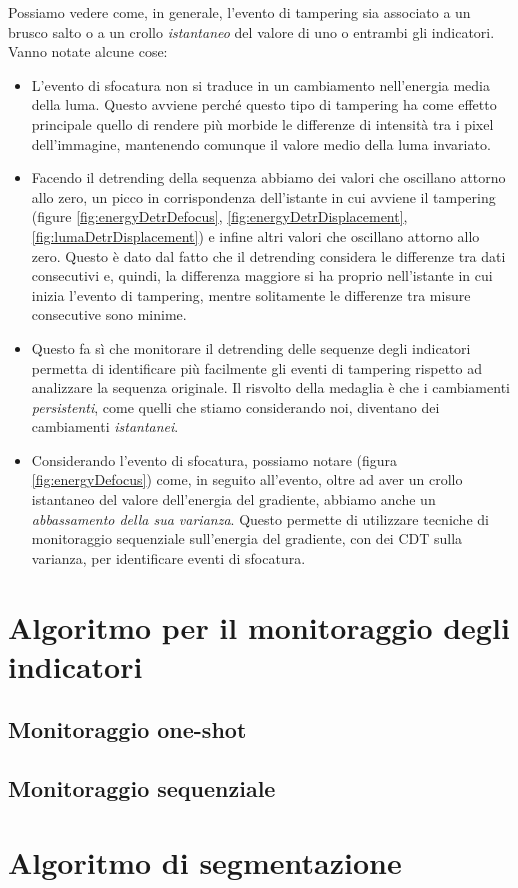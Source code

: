 \noindent Possiamo vedere come, in generale, l'evento di tampering sia associato a un brusco salto o a un crollo \textit{istantaneo} del valore di uno o entrambi gli indicatori.
Vanno notate alcune cose:
\begin{itemize}
	\item L'evento di sfocatura non si traduce in un cambiamento nell'energia media della luma.
	Questo avviene perch\'e questo tipo di tampering ha come effetto principale quello di rendere pi\`u morbide le differenze di intensit\`a tra i pixel dell'immagine, mantenendo comunque il valore medio della luma invariato.
	\item Facendo il detrending della sequenza abbiamo dei valori che oscillano attorno allo zero, un picco in corrispondenza dell'istante in cui avviene il tampering (figure \ref{fig:energyDetrDefocus}, \ref{fig:energyDetrDisplacement}, \ref{fig:lumaDetrDisplacement}) e infine altri valori che oscillano attorno allo zero.
	Questo \`e dato dal fatto che il detrending considera le differenze tra dati consecutivi e, quindi, la differenza maggiore si ha proprio nell'istante in cui inizia l'evento di tampering, mentre solitamente le differenze tra misure consecutive sono minime. 
	\item Questo fa s\`i che monitorare il detrending delle sequenze degli indicatori permetta di identificare pi\`u facilmente gli eventi di tampering rispetto ad analizzare la sequenza originale.
	Il risvolto della medaglia \`e che i cambiamenti \textit{persistenti}, come quelli che stiamo considerando noi, diventano dei cambiamenti \textit{istantanei}.
	\item Considerando l'evento di sfocatura, possiamo notare (figura \ref{fig:energyDefocus}) come, in seguito all'evento, oltre ad aver un crollo istantaneo del valore dell'energia del gradiente, abbiamo anche un \textit{abbassamento della sua varianza}.
	Questo permette di utilizzare tecniche di monitoraggio sequenziale sull'energia del gradiente, con dei CDT sulla varianza, per identificare eventi di sfocatura.
\end{itemize}


\section{Algoritmo per il monitoraggio degli indicatori}
\subsection{Monitoraggio one-shot}
\subsection{Monitoraggio sequenziale}
\section{Algoritmo di segmentazione}
